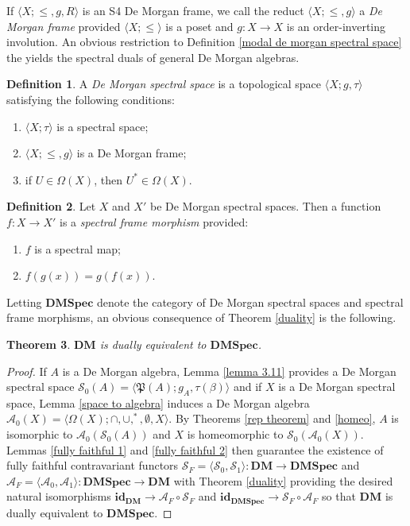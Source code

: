 \documentclass{amsart}
\theoremstyle{plain}
\newtheorem{theorem}{Theorem}[section]
\theoremstyle{definition}
\newtheorem{definition}[theorem]{Definition}
\begin{document}
If $\langle X;\leq,g,R\rangle$ is an S4 De Morgan frame, we call the reduct $\langle X;\leq,g\rangle$ a \emph{De Morgan frame} provided $\langle X;\leq\rangle$ is a poset and $g\colon X\to X$ is an order-inverting involution. An obvious restriction to Definition \ref{modal de morgan spectral space} the yields the spectral duals of general De Morgan algebras. 
\begin{definition}
    A \emph{De Morgan spectral space} is a topological space $\langle X;g,\tau\rangle$ satisfying the following conditions: 
    \begin{enumerate}
        \item $\langle X;\tau\rangle$ is a spectral space; 
        \item $\langle X;\leqslant,g\rangle$ is a De Morgan frame; 
        \item if $U\in\Omega(X)$, then $U^*\in\Omega(X)$. 
    \end{enumerate}
\end{definition}
\begin{definition}\label{spectral frame morphism}
    Let $X$ and $X'$ be De Morgan spectral spaces. Then a function $f\colon X\to X'$ is a \emph{spectral frame morphism} provided:
    \begin{enumerate}
        \item $f$ is a spectral map; 
        \item $f(g(x))=g(f(x))$.   
    \end{enumerate}
\end{definition}

Letting $\mathbf{DMSpec}$ denote the category of De Morgan spectral spaces and spectral frame morphisms, an obvious consequence of Theorem \ref{duality} is the following. 
\begin{theorem}\label{dem duality}
    $\mathbf{DM}$ is dually equivalent to $\mathbf{DMSpec}$. 
\end{theorem}
\begin{proof}
    If $A$ is a De Morgan algebra, Lemma \ref{lemma 3.11} provides a De Morgan spectral space $\mathcal{S}_0(A)=\langle\mathfrak{P}(A);g_A,\tau(\beta)\rangle$ and if $X$ is a De Morgan spectral space, Lemma \ref{space to algebra} induces a De Morgan algebra $\mathcal{A}_0(X)=\langle\Omega(X);\cap,\cup,^*,\emptyset,X\rangle$. By Theorems \ref{rep theorem} and \ref{homeo}, $A$ is isomorphic to $\mathcal{A}_0(\mathcal{S}_0(A))$ and $X$ is homeomorphic to $\mathcal{S}_0(\mathcal{A}_0(X))$. Lemmas \ref{fully faithful 1} and \ref{fully faithful 2} then guarantee the existence of fully faithful contravariant functors $\mathcal{S}_F=\langle\mathcal{S}_0,\mathcal{S}_1\rangle\colon\mathbf{DM}\to\mathbf{DMSpec}$ and $\mathcal{A}_F=\langle\mathcal{A}_0,\mathcal{A}_1\rangle\colon\mathbf{DMSpec}\to\mathbf{DM}$ with Theorem \ref{duality} providing the desired natural isomorphisms $\mathbf{id}_{\mathbf{DM}}\to\mathcal{A}_F\circ\mathcal{S}_F$ and $\mathbf{id}_{\mathbf{DMSpec}}\to\mathcal{S}_F\circ\mathcal{A}_F$ so that $\mathbf{DM}$ is dually equivalent to $\mathbf{DMSpec}$.    
\end{proof}
\end{document}
